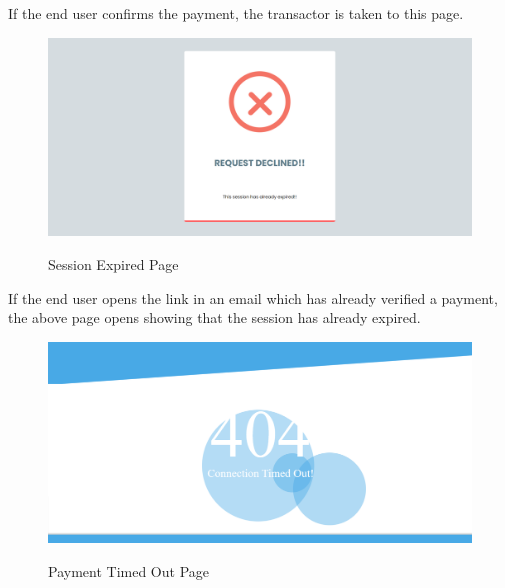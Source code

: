 \documentclass[12pt, oneside, a4paper]{article}
\begin{document}
If the end user confirms the payment, the transactor is taken to this page.

\vspace{0.7cm}

\begin{figure}[H]
\begin{center}
\includegraphics[width=1\textwidth]{Expired.png}\\
\caption{Session Expired Page}
\label{fig:Figure 16}
\end{center}
\end{figure}

If the end user opens the link in an email which has already verified a payment, the above page opens showing that the session has already expired.

\pagebreak

\begin{figure}[H]
\begin{center}
\includegraphics[width=1\textwidth]{Error.png}\\
\caption{Payment Timed Out Page}
\label{fig:Figure 17}
\end{center}
\end{figure} 
\end{document}

